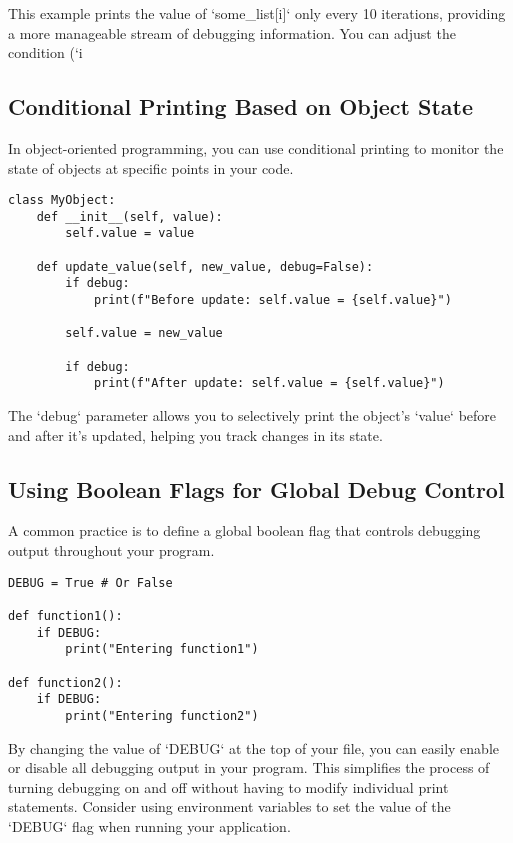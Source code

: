\documentclass{article}
\begin{document}
{{{This example prints the value of `some_list[i]` only every 10 iterations, providing a more manageable stream of debugging information. You can adjust the condition (`i %

\subsection*{Conditional Printing Based on Object State}

In object-oriented programming, you can use conditional printing to monitor the state of objects at specific points in your code.

\begin{verbatim}
class MyObject:
    def __init__(self, value):
        self.value = value

    def update_value(self, new_value, debug=False):
        if debug:
            print(f"Before update: self.value = {self.value}")

        self.value = new_value

        if debug:
            print(f"After update: self.value = {self.value}")
\end{verbatim}

The `debug` parameter allows you to selectively print the object's `value` before and after it's updated, helping you track changes in its state.

\subsection*{Using Boolean Flags for Global Debug Control}

A common practice is to define a global boolean flag that controls debugging output throughout your program.

\begin{verbatim}
DEBUG = True # Or False

def function1():
    if DEBUG:
        print("Entering function1")

def function2():
    if DEBUG:
        print("Entering function2")
\end{verbatim}

By changing the value of `DEBUG` at the top of your file, you can easily enable or disable all debugging output in your program. This simplifies the process of turning debugging on and off without having to modify individual print statements.  Consider using environment variables to set the value of the `DEBUG` flag when running your application.

}}}
\end{document}
